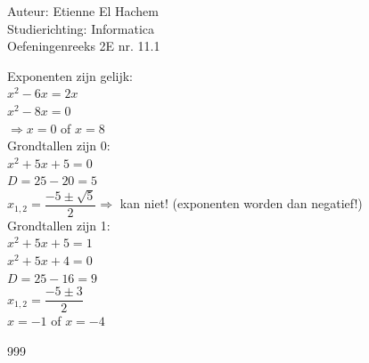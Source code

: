 \documentclass[a4paper]{article}
\begin{document}
  
\noindent \large Auteur: Etienne El Hachem \\
\noindent \large Studierichting: Informatica\\
\noindent \large Oefeningenreeks 2E nr. 11.1\\

\medskip

\normalsize

Exponenten zijn gelijk: \\

$x^2-6x = 2x$ \\

$x^2-8x = 0$ \\

$\Rightarrow x = 0$ of $x = 8$ \\

Grondtallen zijn 0: \\

$x^2+5x+5=0$ \\

$D=25-20=5$\\

$x_{1,2}=\dfrac{-5\pm\sqrt{5}}{2}\Rightarrow$ kan niet! (exponenten worden dan negatief!)\\

Grondtallen zijn 1: \\

$x^2+5x+5 = 1$ \\

$x^2+5x+4=0$ \\

$D = 25-16 = 9$ \\

$x_{1,2} = \dfrac{-5\pm3}{2}$ \\

$x=-1$ of $x=-4$


\begin{thebibliography}{999}
\end{thebibliography}
\end{document}
